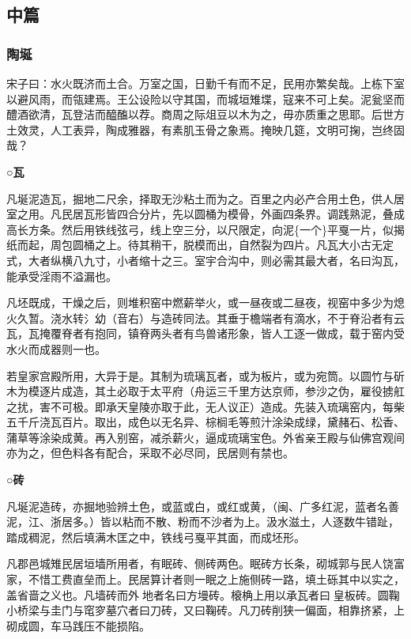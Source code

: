 \documentclass[]{article}
\begin{document}
\hypertarget{header-n2446}{%
\subsection{中篇}\label{header-n2446}}

\hypertarget{header-n2448}{%
\subsubsection{陶埏}\label{header-n2448}}

宋子曰：水火既济而土合。万室之国，日勤千有而不足，民用亦繁矣哉。上栋下室以避风雨，而瓴建焉。王公设险以守其国，而城垣雉堞，寇来不可上矣。泥瓮坚而醴酒欲清，瓦登洁而醯醢以荐。商周之际俎豆以木为之，毋亦质重之思耶。后世方土效灵，人工表异，陶成雅器，有素肌玉骨之象焉。掩映几筵，文明可掬，岂终固哉？

\textbf{○瓦}

凡埏泥造瓦，掘地二尺余，择取无沙粘土而为之。百里之内必产合用土色，供人居室之用。凡民居瓦形皆四合分片，先以圆桶为模骨，外画四条界。调践熟泥，叠成高长方条。然后用铁线弦弓，线上空三分，以尺限定，向泥\{一个\}平戛一片，似揭纸而起，周包圆桶之上。待其稍干，脱模而出，自然裂为四片。凡瓦大小古无定式，大者纵横八九寸，小者缩十之三。室宇合沟中，则必需其最大者，名曰沟瓦，能承受淫雨不溢漏也。

凡坯既成，干燥之后，则堆积窑中燃薪举火，或一昼夜或二昼夜，视窑中多少为熄火久暂。浇水转氵幼（音右）与造砖同法。其垂于檐端者有滴水，不于脊沿者有云瓦，瓦掩覆脊者有抱同，镇脊两头者有鸟兽诸形象，皆人工逐一做成，载于窑内受水火而成器则一也。

若皇家宫殿所用，大异于是。其制为琉璃瓦者，或为板片，或为宛筒。以圆竹与斫木为模逐片成造，其土必取于太平府（舟运三千里方达京师，参沙之伪，雇役掳舡之扰，害不可极。即承天皇陵亦取于此，无人议正）造成。先装入琉璃窑内，每柴五千斤浇瓦百片。取出，成色以无名异、棕榈毛等煎汁涂染成绿，黛赭石、松香、蒲草等涂染成黄。再入别窑，减杀薪火，逼成琉璃宝色。外省亲王殿与仙佛宫观间亦为之，但色料各有配合，采取不必尽同，民居则有禁也。

\textbf{○砖}

凡埏泥造砖，亦掘地验辨土色，或蓝或白，或红或黄，（闽、广多红泥，蓝者名善泥，江、浙居多。）皆以粘而不散、粉而不沙者为上。汲水滋土，人逐数牛错趾，踏成稠泥，然后填满木匡之中，铁线弓戛平其面，而成坯形。

凡郡邑城雉民居垣墙所用者，有眠砖、侧砖两色。眠砖方长条，砌城郭与民人饶富家，不惜工费直垒而上。民居算计者则一眠之上施侧砖一路，填土砾其中以实之，盖省啬之义也。凡墙砖而外地者名曰方墁砖。榱桷上用以承瓦者曰皇板砖。圆鞠小桥梁与圭门与窀穸墓穴者曰刀砖，又曰鞠砖。凡刀砖削狭一偏面，相靠挤紧，上砌成圆，车马践压不能损陷。
\end{document}
